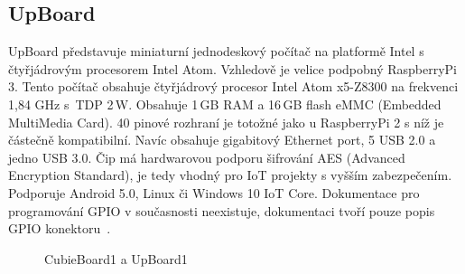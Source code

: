 
\subsection{UpBoard}
		UpBoard představuje miniaturní jednodeskový počítač na platformě Intel s čtyřjádrovým procesorem Intel Atom. Vzhledově je velice podpobný RaspberryPi 3. 
		Tento počítač obsahuje čtyřjádrový procesor Intel Atom x5-Z8300 na frekvenci 1,84 GHz s~TDP 2\,W. Obsahuje 1\,GB RAM a 16\,GB flash eMMC (Embedded MultiMedia Card). 40 pinové rozhraní je totožné jako u RaspberryPi 2 s níž je částečně kompatibilní. Navíc obsahuje gigabitový Ethernet port, 5 USB 2.0 a jedno USB 3.0. Čip má hardwarovou podporu šifrování AES (Advanced Encryption Standard), je tedy vhodný pro IoT projekty s vyšším zabezpečením. Podporuje Android 5.0, Linux či Windows 10 IoT Core. Dokumentace pro programování GPIO v současnosti neexistuje, dokumentaci tvoří pouze popis GPIO konektoru~\cite{UpBoard}.

	\begin{figure}[!ht]
	\vspace{-10pt}	
    \centering
			\hspace*{5mm}
			\caption{CubieBoard1 a UpBoard1}
			\vspace{-10pt}	
\end{figure}
		

	\newpage{}

